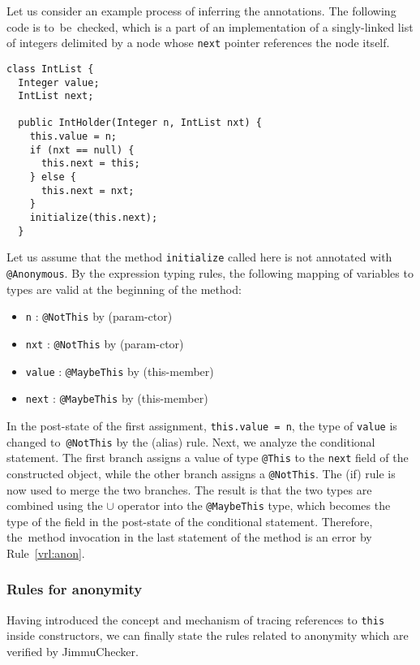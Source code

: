 \documentclass{pracamgr}
\theoremstyle{break}
\theoremstyle{break}
\theoremstyle{break}
\begin{document}
Let us consider an example process of inferring the annotations. The
following code is to~be~checked, which is a part of an implementation
of a singly-linked list of integers delimited by a node whose
\texttt{next} pointer references the node itself.
\begin{lstlisting}
class IntList {
  Integer value;
  IntList next;

  public IntHolder(Integer n, IntList nxt) {
    this.value = n;
    if (nxt == null) {
      this.next = this;
    } else {
      this.next = nxt;
    }
    initialize(this.next);
  }
\end{lstlisting}
Let us assume that the method \texttt{initialize} called here is not
annotated with \texttt{@Anonymous}. By the expression typing rules,
the following mapping of variables to types are valid at the beginning
of the method:
\begin{itemize}
\item \texttt{n} : \texttt{@NotThis} by (param-ctor)
\item \texttt{nxt} : \texttt{@NotThis} by (param-ctor)
\item \texttt{value} : \texttt{@MaybeThis} by (this-member)
\item \texttt{next} : \texttt{@MaybeThis} by (this-member)
\end{itemize}
In the post-state of the first assignment, \texttt{this.value = n},
the type of \texttt{value} is changed to~\texttt{@NotThis} by the
(alias) rule. Next, we analyze the conditional statement. The first
branch assigns a value of type \texttt{@This} to the \texttt{next}
field of the constructed object, while the other branch assigns a
\texttt{@NotThis}. The (if) rule is now used to merge the two
branches. The result is that the two types are combined using the
$\cup$ operator into the \texttt{@MaybeThis} type, which becomes the
type of the field in the post-state of the conditional statement.
Therefore, the~method invocation in the last statement of the method
is an error by Rule~\ref{vrl:anon}.

\subsubsection{Rules for anonymity} 

Having introduced the concept and mechanism of tracing references to
\texttt{this} inside constructors, we can finally state the rules
related to anonymity which are verified by JimmuChecker.
\end{document}

